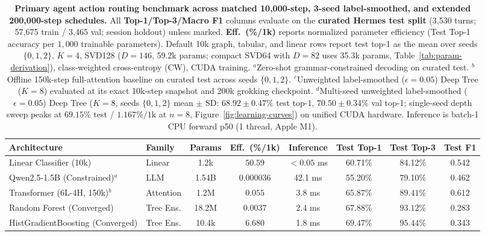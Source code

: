 \documentclass[10pt,twocolumn,letterpaper]{article}
\begin{document}
\begin{table}[tbp]
\centering
\small
\setlength{\tabcolsep}{3pt}
\caption{\textbf{Primary agent action routing benchmark across matched 10{,}000-step, 3-seed label-smoothed, and extended 200{,}000-step schedules.} All \textbf{Top-1/Top-3/Macro F1} columns evaluate on the \textbf{curated Hermes test split} (3{,}530 turns; 57{,}675 train / 3{,}465 val; session holdout) unless marked. \textbf{Eff.\ (\%/1k)} reports normalized parameter efficiency (Test Top-1 accuracy per $1{,}000$ trainable parameters). Default 10k graph, tabular, and linear rows report test top-1 as the mean over seeds $\{0,1,2\}$, $K{=}4$, SVD128 ($D{=}146$, 59.2k params; compact SVD64 with $D{=}82$ uses 35.3k params, Table~\ref{tab:param-derivation}), class-weighted cross-entropy (CW), CUDA training. $^a$Zero-shot grammar-constrained decoding on curated test. $^b$Offline 150k-step full-attention baseline on curated test across seeds $\{0,1,2\}$. $^c$Unweighted label-smoothed ($\epsilon{=}0.05$) Deep Tree ($K{=}8$) evaluated at its exact 10k-step snapshot and 200k grokking checkpoint. $^d$Multi-seed unweighted label-smoothed ($\epsilon{=}0.05$) Deep Tree ($K{=}8$, seeds $\{0,1,2\}$ mean $\pm$ SD: $68.92 \pm 0.47\%$ test top-1, $70.50 \pm 0.34\%$ val top-1; single-seed depth sweep peaks at $69.15\%$ test / $1.167\%/\text{1k}$ at $n{=}8$, Figure~\ref{fig:learning-curves}) on unified CUDA hardware. Inference is batch-1 CPU forward p50 (1 thread, Apple M1).}
\label{tab:primary}
\vspace{6pt}
\begin{tabular*}{\textwidth}{@{\extracolsep{\fill}}llcccccc@{}}
\toprule
\textbf{Architecture} & \textbf{Family} & \textbf{Params} & \textbf{Eff.\ (\%/1k)} & \textbf{Inference} & \textbf{Test Top-1} & \textbf{Test Top-3} & \textbf{Test F1} \\
\midrule
Linear Classifier (10k) & Linear & 1.2k & $50.59$ & $<0.05$ ms & 60.71\% & 84.12\% & 0.542 \\
Qwen2.5-1.5B (Constrained)$^a$ & LLM & 1.54B & $0.000036$ & 42.1 ms & 55.20\% & 79.10\% & 0.462 \\
Transformer (6L-4H, 150k)$^b$ & Attention & 1.2M & $0.055$ & 3.8 ms & $65.87\%$ & $89.41\%$ & $0.612$ \\
Random Forest (Converged) & Tree Ens. & 18.2M & $0.0037$ & 2.4 ms & $67.88\%$ & $93.12\%$ & 0.283 \\
HistGradientBoosting (Converged) & Tree Ens. & 10.4k & $6.680$ & 1.8 ms & $\mathbf{69.47\%}$ & $\mathbf{95.44\%}$ & 0.343 \\

\end{tabular*}
\end{table}
\end{document}
